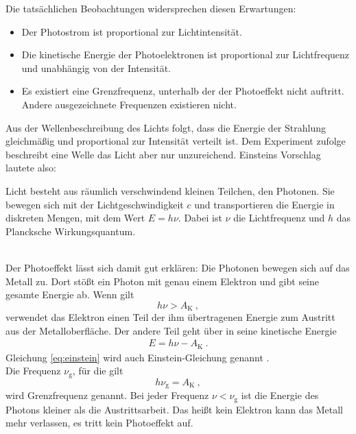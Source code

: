 Die tatsächlichen Beobachtungen widersprechen diesen Erwartungen:
\begin{itemize}
	\item Der Photostrom ist proportional zur Lichtintensität.
	\item Die kinetische Energie der Photoelektronen ist proportional zur Lichtfrequenz und unabhängig von der Intensität.
	\item Es existiert eine Grenzfrequenz, unterhalb der der Photoeffekt nicht auftritt. Andere ausgezeichnete Frequenzen existieren nicht.
\end{itemize}
Aus der Wellenbeschreibung des Lichts folgt, dass die Energie der Strahlung gleichmäßig und proportional zur Intensität verteilt ist. Dem Experiment zufolge beschreibt eine Welle das Licht aber nur unzureichend. Einsteins Vorschlag lautete also: \\
\par
\begingroup
{}
\rightskip\leftskip
{Licht besteht aus räumlich verschwindend kleinen Teilchen, den Photonen. Sie bewegen sich mit der Lichtgeschwindigkeit $c$ und transportieren die Energie in diskreten Mengen, mit dem Wert $E=h\nu$. Dabei ist $\nu$ die Lichtfrequenz und $h$ das Plancksche Wirkungsquantum.}
\par
\endgroup
\ \\
Der Photoeffekt lässt sich damit gut erklären: Die Photonen bewegen sich auf das Metall zu. Dort stößt ein Photon mit genau einem Elektron und gibt seine gesamte Energie ab. Wenn gilt
\[ h\nu > A_\text{K} \ ,\]
verwendet das Elektron einen Teil der ihm übertragenen Energie zum Austritt aus der Metalloberfläche. Der andere Teil geht über in seine kinetische Energie
\begin{align}\label{eq:einstein}
	E = h\nu - A_\text{K} \ .
\end{align}
Gleichung \ref{eq:einstein} wird auch Einstein-Gleichung genannt \cite{Gerthsen}. \\
Die Frequenz $\nu_\text{g}$, für die gilt
\[ h\nu_\text{g} = A_\text{K} \ , \]
wird Grenzfrequenz genannt. Bei jeder Frequenz $\nu<\nu_\text{g}$ ist die Energie des Photons kleiner als die Austrittsarbeit. Das heißt kein Elektron kann das Metall mehr verlassen, es tritt kein Photoeffekt auf.